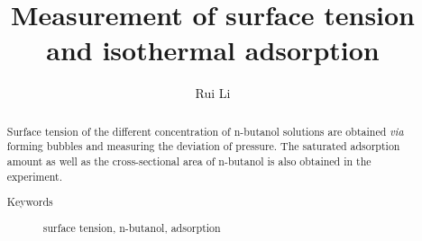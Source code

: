 \documentclass[%
 reprint,
 amsmath,amssymb,
 aps,
10.5pt,
]{revtex4-1}
\begin{document}

\title{Measurement of surface tension and isothermal adsorption}%

\author{Rui Li}
%





\begin{abstract}
Surface tension of the different concentration of n-butanol solutions are obtained \emph{via} forming bubbles and measuring the deviation of pressure. The saturated adsorption amount as well as the cross-sectional area of n-butanol is also obtained in the experiment.
\begin{description}
\item[Keywords]
surface tension, n-butanol, adsorption
\end{description}
\end{abstract}

\maketitle
\end{document}
